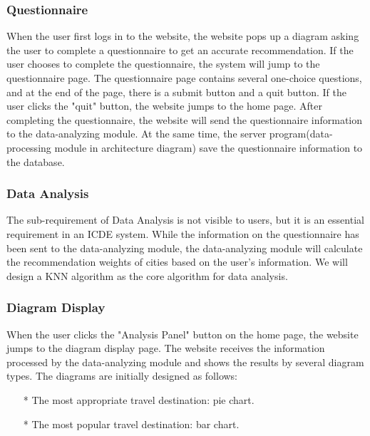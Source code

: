 \documentclass[conference]{IEEEtran}
\begin{document}
\subsubsection{ Questionnaire }

When the user first logs in to the website, the website pops up a diagram asking the user to complete a questionnaire to 
get an accurate recommendation. If the user chooses 
to complete the questionnaire, the system will jump to the questionnaire page. The questionnaire page contains several one-choice questions, and
at the end of the page, there is a submit button and a quit button. If the user clicks the "quit" button, the website jumps to the home page.
After completing the questionnaire, the website will send the 
questionnaire information to the data-analyzing module. At the same time, the server program(data-processing module in architecture diagram) 
save the questionnaire information to the database.

\subsubsection{ Data Analysis }

The sub-requirement of Data Analysis is not visible to users, but it is an essential requirement in an ICDE system. While the information on the questionnaire has been sent to
the data-analyzing module, the data-analyzing module will calculate the recommendation weights of cities based on the user's information. We will design a KNN algorithm as the core 
algorithm for data analysis.  


\subsubsection{ Diagram Display }

When the user clicks the "Analysis Panel" button on the home page, the website jumps to the diagram display page.
The website receives the information processed by the data-analyzing module and shows the results by several diagram types. 
The diagrams are initially designed as follows:

\begin{itemize}
\item[*] The most appropriate travel destination: pie chart.

\item[*] The most popular travel destination: bar chart.
\end{itemize}
\end{document}
